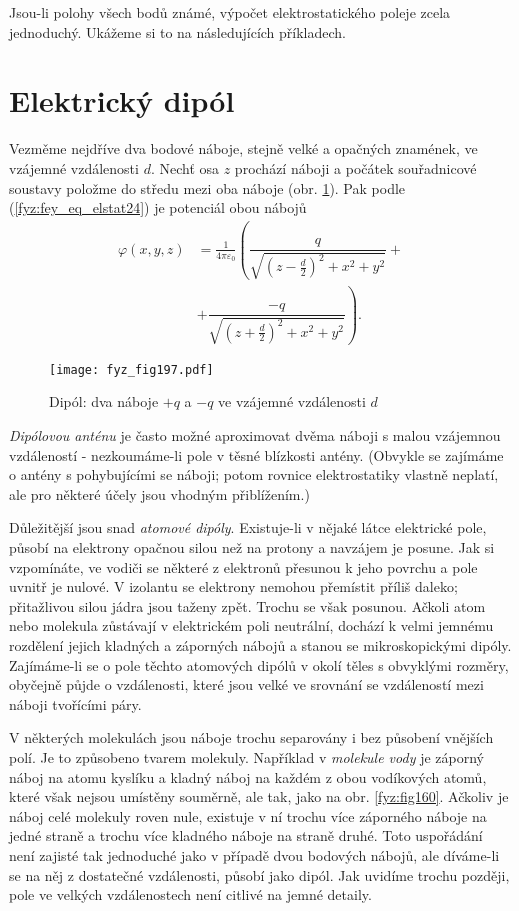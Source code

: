   Jsou-li polohy všech bodů známé, výpočet elektrostatického poleje zcela jednoduchý. Ukážeme si to
  na následujících příkladech.

\section{Elektrický dipól}\label{fyz:IIchapVsecXI}
  Vezměme nejdříve dva bodové náboje, stejně velké a opačných znamének, ve vzájemné vzdálenosti
  \(d\). Nechť osa \(z\) prochází náboji a počátek souřadnicové soustavy položme do středu mezi oba
  náboje (obr. \ref{fyz:fig197}). Pak podle (\ref{fyz:fey_eq_elstat24}) je potenciál obou nábojů
  \begin{align}
    \varphi(x,y,z) 
      &= \frac{1}{4\pi\varepsilon_0}
         \left(\dfrac{q}{\sqrt{(z -\frac{d}{2})^2+x^2+y^2}} + \right.    \nonumber \\         
      &+ \left.\dfrac{-q}{\sqrt{(z+\frac{d}{2})^2+x^2+y^2}}\right).      \label{fyz:eq_fey_009}
  \end{align}
  \begin{figure}[ht!] %
    \centering
    \texttt{[image: fyz\_fig197.pdf]}
    \caption{Dipól: dva náboje \(+q\) a \(-q\) ve vzájemné vzdálenosti \(d\)}
    \label{fyz:fig197}
  \end{figure}
  \emph{Dipólovou anténu} je často možné aproximovat dvěma náboji s malou vzájemnou vzdáleností -
  nezkoumáme-li pole v těsné blízkosti antény. (Obvykle se zajímáme o antény s pohybujícími se
  náboji; potom rovnice elektrostatiky vlastně neplatí, ale pro některé účely jsou vhodným
  přiblížením.)
  
  Důležitější jsou snad \emph{atomové dipóly}. Existuje-li v nějaké látce elektrické pole, působí na
  elektrony opačnou silou než na protony a navzájem je posune. Jak si vzpomínáte, ve vodiči se
  některé z elektronů přesunou k jeho povrchu a pole uvnitř je nulové. V izolantu se elektrony
  nemohou přemístit příliš daleko; přitažlivou silou jádra jsou taženy zpět. Trochu se však posunou.
  Ačkoli atom nebo molekula zůstávají v elektrickém poli neutrální, dochází k velmi jemnému
  rozdělení jejich kladných a záporných nábojů a stanou se mikroskopickými dipóly. Zajímáme-li se o
  pole těchto atomových dipólů v okolí těles s obvyklými rozměry, obyčejně půjde o vzdálenosti,
  které jsou velké ve srovnání se vzdáleností mezi náboji tvořícími páry.
  
  V některých molekulách jsou náboje trochu separovány i bez působení vnějších polí. Je to způsobeno
  tvarem molekuly. Například v \emph{molekule vody} je záporný náboj na atomu kyslíku a kladný náboj
  na každém z obou vodíkových atomů, které však nejsou umístěny souměrně, ale tak, jako na obr.
  \ref{fyz:fig160}. Ačkoliv je náboj celé molekuly roven nule, existuje v ní trochu více záporného
  náboje na jedné straně a trochu více kladného náboje na straně druhé. Toto uspořádání není zajisté
  tak jednoduché jako v případě dvou bodových nábojů, ale díváme-li se na něj z dostatečné
  vzdálenosti, působí jako dipól. Jak uvidíme trochu později, pole ve velkých vzdálenostech není
  citlivé na jemné detaily.

